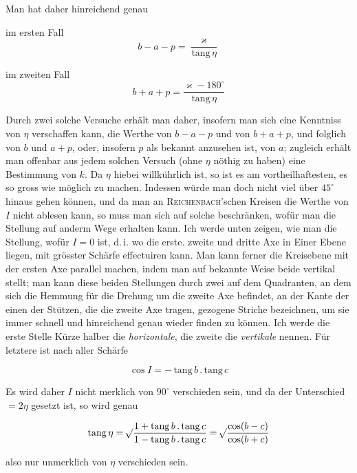 \par\indent Man hat daher hinreichend genau

\noindent im ersten Fall \[ b - a - p = \frac{\varkappa}{\mathrm{tang}\,\eta} \]

\noindent im zweiten Fall \[ b + a + p = \frac{\varkappa - 180^\circ}{\mathrm{tang}\,\eta} \]

\par\indent Durch zwei solche Versuche erhält man daher, insofern man sich eine Kenntniss von $\eta$ verschaffen kann, die Werthe von $b-a-p$ und von $b+a+p$, und folglich von $b$ und $a+p$, oder, insofern $p$ als bekannt anzusehen ist, von $a$; zugleich erhält man offenbar aus jedem solchen Versuch (ohne $\eta$ nöthig zu haben) eine Bestimmung von $k$. Da $\eta$ hiebei willkührlich ist, so ist es am vortheilhaftesten, es so gross wie möglich zu machen. Indessen würde man doch nicht viel über $45^\circ$ hinaus gehen können, und da man an \textsc{Reichenbach}'schen Kreisen die Werthe von $I$ nicht ablesen kann, so muss man sich auf solche beschränken, wofür man die Stellung auf anderm Wege erhalten kann. Ich werde unten zeigen, wie man die Stellung, wofür $I=0$ ist, d.\,i. wo die erste. zweite und dritte Axe in Einer Ebene liegen, mit grösster Schärfe effectuiren kann. Man kann ferner die Kreisebene mit der ersten Axe parallel machen, indem man auf bekannte Weise beide vertikal stellt; man kann diese beiden Stellungen durch zwei auf dem Quadranten, an dem sich die Hemmung für die Drehung um die zweite Axe befindet, an der Kante der einen der Stützen, die die zweite Axe tragen, gezogene Striche bezeichnen, um sie immer schnell und hinreichend genau wieder finden zu können. Ich werde die erste Stelle Kürze halber die \emph{horizontale}, die zweite die \emph{vertikale} nennen. Für letztere ist nach aller Schärfe

\[ \cos I = -\,\mathrm{tang}\,b\,.\,\mathrm{tang}\,c \]

\noindent Es wird daher $I$ nicht merklich von $90^\circ$ verschieden sein, und da der Unterschied $=2\eta$ gesetzt ist, so wird genau

\[ \mathrm{tang}\,\eta = \mathord{{}^{}\!\surd}\dfrac{1+\mathrm{tang}\,b\,.\,\mathrm{tang}\,c}{1-\mathrm{tang}\,b\,.\,\mathrm{tang}\,c} = \mathord{{}^{}\!\surd}\dfrac{\cos(b-c)}{\cos(b+c)} \]

\noindent also nur unmerklich von $\eta$ verschieden sein.


